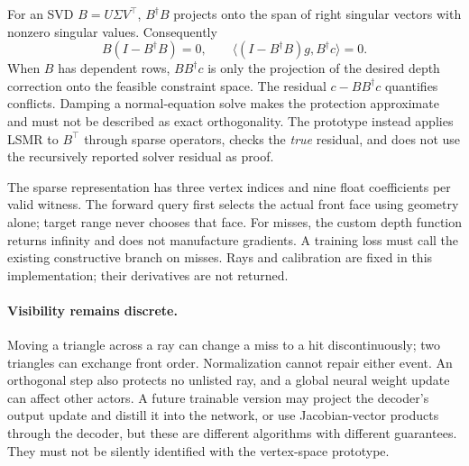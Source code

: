 For an SVD $B=U\Sigma V^\top$, $B^\dagger B$ projects onto the span of right singular vectors with nonzero singular values. Consequently
\begin{equation}
 B(I-B^\dagger B)=0,\qquad
 \langle (I-B^\dagger B)g,B^\dagger c\rangle=0.
\end{equation}
When $B$ has dependent rows, $BB^\dagger c$ is only the projection of the desired depth correction onto the feasible constraint space. The residual $c-BB^\dagger c$ quantifies conflicts. Damping a normal-equation solve makes the protection approximate and must not be described as exact orthogonality. The prototype instead applies LSMR to $B^\top$ through sparse operators, checks the \emph{true} residual, and does not use the recursively reported solver residual as proof.

The sparse representation has three vertex indices and nine float coefficients per valid witness. The forward query first selects the actual front face using geometry alone; target range never chooses that face. For misses, the custom depth function returns infinity and does not manufacture gradients. A training loss must call the existing constructive branch on misses. Rays and calibration are fixed in this implementation; their derivatives are not returned.

\paragraph{Visibility remains discrete.}
Moving a triangle across a ray can change a miss to a hit discontinuously; two triangles can exchange front order. Normalization cannot repair either event. An orthogonal step also protects no unlisted ray, and a global neural weight update can affect other actors. A future trainable version may project the decoder's output update and distill it into the network, or use Jacobian-vector products through the decoder, but these are different algorithms with different guarantees. They must not be silently identified with the vertex-space prototype.

